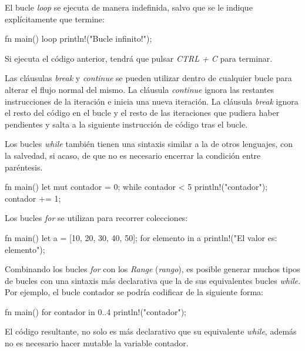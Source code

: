 El bucle \textit{loop} se ejecuta de manera indefinida, salvo que se le indique explícitamente que termine:

\vspace{0.7em}
\begin{Codigo}
fn main() {
   loop {
      println!("Bucle infinito!");
   }
}
\end{Codigo}

Si ejecuta el código anterior, tendrá que pulsar \textit{CTRL + C} para terminar.

Las cláusulas \textit{break} y \textit{continue} se pueden utilizar dentro de cualquier bucle para alterar el flujo normal del mismo. La cláusula \textit{continue} ignora las restantes instrucciones de la iteración e inicia una nueva iteración. La cláusula \textit{break} ignora el resto del código en el bucle y el resto de las iteraciones que pudiera haber pendientes y salta a la siguiente instrucción de código tras el bucle.

Los bucles \textit{while} también tienen una sintaxis similar a la de otros lenguajes, con la salvedad, si acaso, de que no es necesario encerrar la condición entre paréntesis.

\vspace{0.7em}
\begin{Codigo}
fn main() {
   let mut contador = 0;
   while contador < 5 {
      println!("{contador}");
      contador += 1;
   }
}
\end{Codigo}


Los bucles \textit{for} se utilizan para recorrer colecciones:

\vspace{0.7em}
\begin{Codigo}
fn main() {
   let a = [10, 20, 30, 40, 50];
   for elemento in a {
      println!("El valor es: {elemento}");
   }
}
\end{Codigo}

Combinando los bucles \textit{for} con los \textit{Range} (\textit{rango}), es posible generar muchos tipos de bucles con una sintaxis más declarativa que la de sus equivalentes bucles \textit{while}. Por ejemplo, el bucle contador se podría codificar de la siguiente forma:

\vspace{0.7em}
\begin{Codigo}
fn main() {
   for contador in 0..4 {
      println!("{contador}");
   }
}
\end{Codigo}

El código resultante, no solo es más declarativo que su equivalente \textit{while}, además no es necesario hacer mutable la variable contador.

